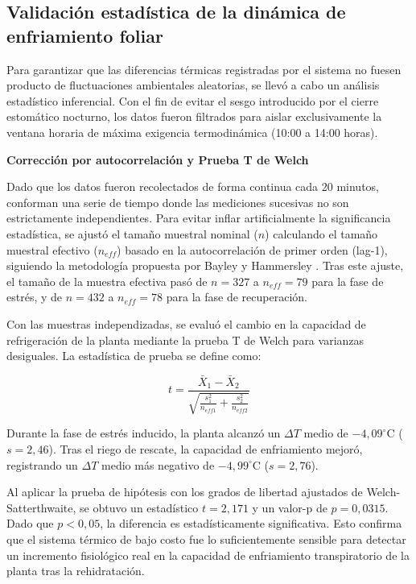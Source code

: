 \subsection{Validación estadística de la dinámica de enfriamiento foliar}
\label{subsec:validacion_estadistica}

Para garantizar que las diferencias térmicas registradas por el sistema no fuesen producto de fluctuaciones ambientales aleatorias, se llevó a cabo un análisis estadístico inferencial. Con el fin de evitar el sesgo introducido por el cierre estomático nocturno, los datos fueron filtrados para aislar exclusivamente la ventana horaria de máxima exigencia termodinámica (10:00 a 14:00 horas).

\textbf{Corrección por autocorrelación y Prueba T de Welch}

Dado que los datos fueron recolectados de forma continua cada 20 minutos, conforman una serie de tiempo donde las mediciones sucesivas no son estrictamente independientes. Para evitar inflar artificialmente la significancia estadística, se ajustó el tamaño muestral nominal ($n$) calculando el tamaño muestral efectivo ($n_{eff}$) basado en la autocorrelación de primer orden (lag-1), siguiendo la metodología propuesta por Bayley y Hammersley . Tras este ajuste, el tamaño de la muestra efectiva pasó de $n = 327$ a $n_{eff} = 79$ para la fase de estrés, y de $n = 432$ a $n_{eff} = 78$ para la fase de recuperación.

Con las muestras independizadas, se evaluó el cambio en la capacidad de refrigeración de la planta mediante la prueba T de Welch para varianzas desiguales. La estadística de prueba se define como:

$$t = \frac{\bar{X}_1 - \bar{X}_2}{\sqrt{\frac{s_1^2}{n_{eff1}} + \frac{s_2^2}{n_{eff2}}}}$$

Durante la fase de estrés inducido, la planta alcanzó un $\Delta T$ medio de $-4,09^{\circ}\text{C}$ ($s = 2,46$). Tras el riego de rescate, la capacidad de enfriamiento mejoró, registrando un $\Delta T$ medio más negativo de $-4,99^{\circ}\text{C}$ ($s = 2,76$). 

Al aplicar la prueba de hipótesis con los grados de libertad ajustados de Welch-Satterthwaite, se obtuvo un estadístico $t = 2,171$ y un valor-p de $p = 0,0315$. Dado que $p < 0,05$, la diferencia es estadísticamente significativa. Esto confirma que el sistema térmico de bajo costo fue lo suficientemente sensible para detectar un incremento fisiológico real en la capacidad de enfriamiento transpiratorio de la planta tras la rehidratación.

